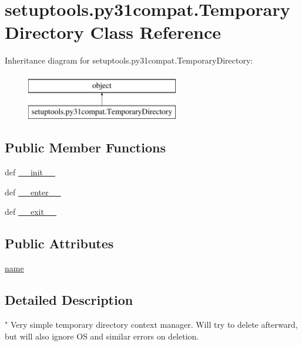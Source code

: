 \hypertarget{classsetuptools_1_1py31compat_1_1TemporaryDirectory}{}\section{setuptools.\+py31compat.\+Temporary\+Directory Class Reference}
\label{classsetuptools_1_1py31compat_1_1TemporaryDirectory}
Inheritance diagram for setuptools.\+py31compat.\+Temporary\+Directory\+:\begin{figure}[H]
\begin{center}
\leavevmode
\includegraphics[height=2.000000cm]{classsetuptools_1_1py31compat_1_1TemporaryDirectory}
\end{center}
\end{figure}
\subsection*{Public Member Functions}
\begin{DoxyCompactItemize}
\item 
def \hyperlink{classsetuptools_1_1py31compat_1_1TemporaryDirectory_ab22d9b953e281d0cd86c8e07329d111a}{\+\_\+\+\_\+init\+\_\+\+\_\+}
\item 
def \hyperlink{classsetuptools_1_1py31compat_1_1TemporaryDirectory_a6debd3fcfc1c09902296639502fa2eb3}{\+\_\+\+\_\+enter\+\_\+\+\_\+}
\item 
def \hyperlink{classsetuptools_1_1py31compat_1_1TemporaryDirectory_a1361e5f256b756aec400b88f49a2562d}{\+\_\+\+\_\+exit\+\_\+\+\_\+}
\end{DoxyCompactItemize}
\subsection*{Public Attributes}
\begin{DoxyCompactItemize}
\item 
\hyperlink{classsetuptools_1_1py31compat_1_1TemporaryDirectory_a26eb31a3d0507067b022e1dc09f7c300}{name}
\end{DoxyCompactItemize}


\subsection{Detailed Description}
\begin{DoxyVerb}"
Very simple temporary directory context manager.
Will try to delete afterward, but will also ignore OS and similar
errors on deletion.
\end{DoxyVerb}
 

